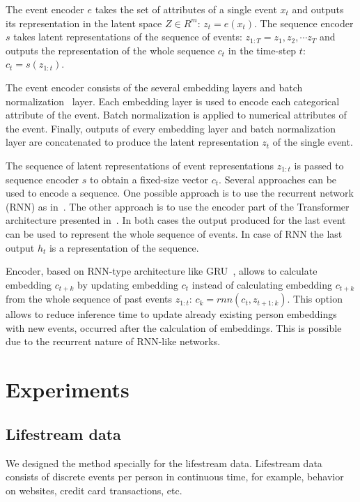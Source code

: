 \documentclass{article}
\begin{document}
The event encoder $e$ takes the set of attributes of a single event $x_t$ and outputs its representation in the latent space $Z \in R^m$: $z_t = e(x_t)$. The sequence encoder $s$ takes latent representations of the sequence of events: $ z_{1:T} = z_1, z_2, \cdots z_T $ and outputs the representation of the whole sequence $c_t$ in the time-step $t$: $ c_t = s(z_{1:t}) $.

The event encoder consists of the several embedding layers and batch normalization~\cite{Babaev2019ETRNNAD} layer. Each embedding layer is used to encode each categorical attribute of the event. Batch normalization is applied to numerical attributes of the event. Finally, outputs of every embedding layer and batch normalization layer are concatenated to produce the latent representation $z_t$ of the single event.

The sequence of latent representations of event representations $z_{1:t}$ is passed to sequence encoder $s$ to obtain a fixed-size vector $c_t$. Several approaches can be used to encode a sequence. One possible approach is to use the recurrent network (RNN) as in~\cite{Sutskever2014SequenceTS}. The other approach is to use the encoder part of the Transformer architecture presented in~\cite{Vaswani2017AttentionIA}. In both cases the output produced for the last event can be used to represent the whole sequence of events. In case of RNN the last output $h_t$ is a representation of the sequence.

Encoder, based on RNN-type architecture like GRU~\cite{Cho2014LearningPR}, allows to calculate embedding $c_{t+k}$ by updating embedding $c_t$ instead of  calculating embedding $c_{t+k}$ from the whole sequence of past events $z_{1:t}$: $c_k = rnn(c_t, z_{t+1:k})$. This option allows to reduce inference time to update already existing person embeddings with new events, occurred after the calculation of embeddings. This is possible due to the recurrent nature of RNN-like networks.



\section{Experiments} \label{sec-exp}

\subsection{Lifestream data}

We designed the method specially for the lifestream data. Lifestream data consists of discrete events per person in continuous time, for example,  behavior on websites, credit card transactions, etc. 
\end{document}
